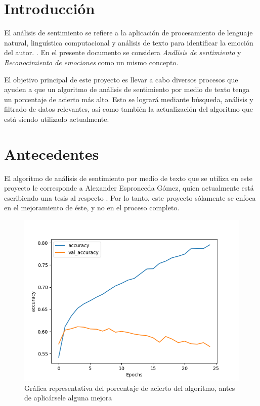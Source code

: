 \documentclass[a4]{sciposter}
\begin{document}
\begin{multicols}{3} 

\section{Introducción}
El análisis de sentimiento se refiere a la aplicación de procesamiento de lenguaje natural, linguística computacional y análisis de texto para identificar la emoción del autor. \citep{definition}. En el presente documento se considera \textit{Análisis de sentimiento} y \textit{Reconocimiento de emociones} como un mismo concepto.

El objetivo principal de este proyecto es llevar a cabo diversos procesos que ayuden a que un algoritmo de análisis de sentimiento por medio de texto tenga un porcentaje de acierto más alto. Esto se logrará mediante búsqueda, análisis y filtrado de datos relevantes, así como también la actualización del algoritmo que está siendo utilizado actualmente.

\section{Antecedentes}

El algoritmo de análisis de sentimiento por medio de texto que se utiliza en este proyecto le corresponde a Alexander Espronceda Gómez, quien actualmente está escribiendo una tesis al respecto \citep{software conversacional}. Por lo tanto, este proyecto sólamente se enfoca en el mejoramiento de éste, y no en el proceso completo.
\begin{figure}
	\centering
	\captionsetup{type=figure}
	\setcounter{figure}{0}
	\includegraphics[scale=1.3]{img/Accuracy 2020-05_nofilter}
	\caption{Gráfica representativa del porcentaje de acierto del algoritmo, antes de aplicársele alguna mejora}
	

\end{figure}
\end{multicols}
\end{document}
